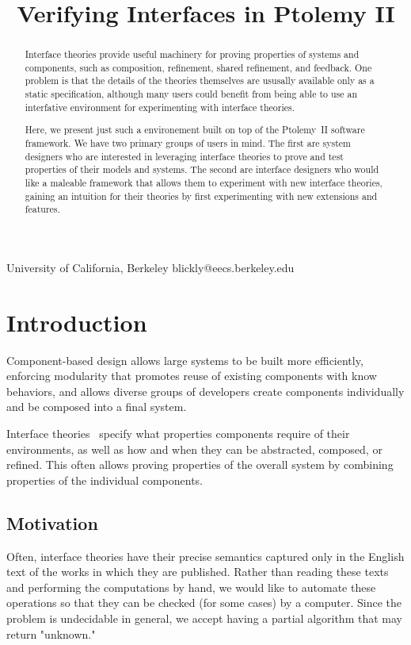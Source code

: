 \documentclass[preprint,11pt]{sigplanconf}
\begin{document}
\title{Verifying Interfaces in Ptolemy II}

           {University of California, Berkeley} {blickly@eecs.berkeley.edu}

\maketitle

\begin{abstract}
Interface theories provide useful machinery for proving properties of systems
and components, such as composition, refinement, shared refinement, and
feedback. One problem is that the details of the theories themselves are
ususally available only as a static specification, although many users
could benefit from being able to use an interfative environment for
experimenting with interface theories.

Here, we present just such a environement built on top of the Ptolemy~II
software framework. We have two primary groups of users in mind. The first are
system designers who are interested in leveraging interface theories to prove and test
properties of their models and systems.  The second are interface designers who
would like a maleable framework that allows them to experiment with new
interface theories, gaining an intuition for their theories by first
experimenting with new extensions and features.
\end{abstract}

\section{Introduction}
Component-based design allows large systems to be built more efficiently,
enforcing modularity that promotes reuse of existing components with
know behaviors, and allows diverse groups of developers create components
individually and be composed into a final system. 

Interface theories~\cite{interfaceTheories} specify what properties components
require of their environments, as well as how and when they can be abstracted,
composed, or refined. This often allows proving properties of the overall system
by combining properties of the individual components.

\subsection{Motivation}
Often, interface theories have their precise semantics captured only in the
English text of the works in which they are published. Rather than reading these
texts and performing the computations by hand, we would like to automate these
operations so that they can be checked (for some cases) by a computer. Since the
problem is undecidable in general, we accept having a partial algorithm that may
return "unknown."
\end{document}

